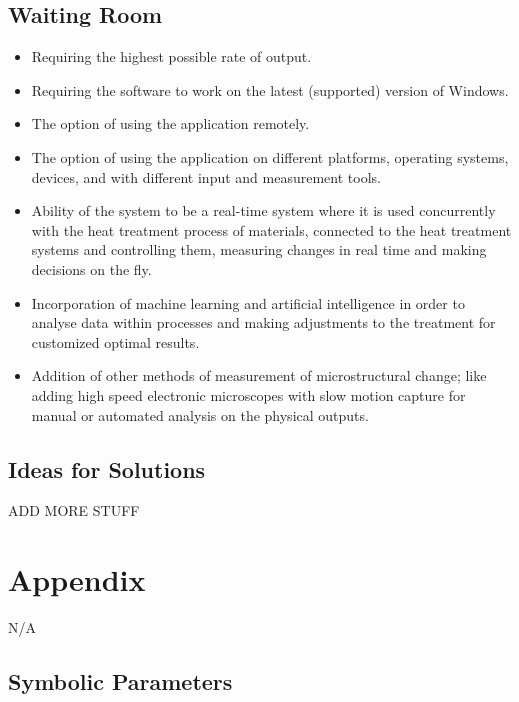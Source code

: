 \documentclass[12pt, titlepage]{article}
\begin{document}
\subsection{Waiting Room}
\begin{itemize}
    \item Requiring the highest possible rate of output.
    \item Requiring the software to work on the latest (supported) version of Windows.
    \item The option of using the application remotely.
    \item The option of using the application on different platforms, operating systems, devices, and with different input and measurement tools.
    \item Ability of the system to be a real-time system where it is used concurrently with the heat treatment process of materials, connected to the heat treatment systems and controlling them, measuring changes in real time and making decisions on the fly.
    \item Incorporation of machine learning and artificial intelligence in order to analyse data within processes and making adjustments to the treatment for customized optimal results.
    \item Addition of other methods of measurement of microstructural change; like adding high speed electronic microscopes with slow motion capture for manual or automated analysis on the physical outputs.
\end{itemize}

\subsection{Ideas for Solutions}
ADD MORE STUFF





\newpage

\section{Appendix}

N/A

\subsection{Symbolic Parameters}
\end{document}
